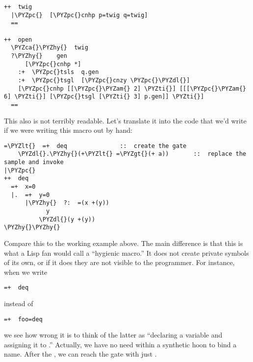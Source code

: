 \begin{framed_shaded}
\begin{Verbatim}[fontsize=\relsize{-2.5},fontseries=b,commandchars=\\\{\}]
++  twig
  |\PYZpc{}  [\PYZpc{}cnhp p=twig q=twig]
  ==

++  open
  \PYZca{}\PYZhy{}  twig
  ?\PYZhy{}    gen
      [\PYZpc{}cnhp *]
    :+  \PYZpc{}tsls  q.gen
    :+  \PYZpc{}tsgl  [\PYZpc{}cnzy \PYZpc{}\PYZdl{}]
    [\PYZpc{}cnhp [[\PYZpc{}\PYZam{} 2] \PYZti{}] [[[\PYZpc{}\PYZam{} 6] \PYZti{}] [\PYZpc{}tsgl [\PYZti{} 3] p.gen]] \PYZti{}]
  ==
\end{Verbatim}
\end{framed_shaded}
This also is not terribly readable.  Let's translate it into the
code that we'd write if we were writing this macro out by hand:
\begin{framed_shaded}
\begin{Verbatim}[fontsize=\relsize{-2.5},fontseries=b,commandchars=\\\{\}]
=\PYZlt{}  =+  deq               ::  create the gate
    \PYZdl{}.\PYZhy{}(+\PYZlt{} =\PYZgt{}(+ a))       ::  replace the sample and invoke
|\PYZpc{}
++  deq
  =+  x=0
  |.  =+  y=0
      |\PYZhy{}  ?:  =(x +(y))
            y
          \PYZdl{}(y +(y))
\PYZhy{}\PYZhy{}
\end{Verbatim}
\end{framed_shaded}

Compare this to the working example above.  The main difference
is that this is what a Lisp fan would call a ``hygienic macro.''
It does not create private symbols of its own, or if it does they
are not visible to the programmer.  For instance, when we write

\begin{framed_shaded}
\begin{Verbatim}[fontsize=\relsize{-2.5},fontseries=b,commandchars=\\\{\}]
=+  deq
\end{Verbatim}
\end{framed_shaded}
instead of

\begin{framed_shaded}
\begin{Verbatim}[fontsize=\relsize{-2.5},fontseries=b,commandchars=\\\{\}]
=+  foo=deq
\end{Verbatim}
\end{framed_shaded}
we see how wrong it is to think of the latter as ``declaring a
variable  and assigning it to .''  Actually, we have no
need within a synthetic hoon to bind a name.  After the \kode{=+}, we
can reach the gate with just \kode{-}. 

